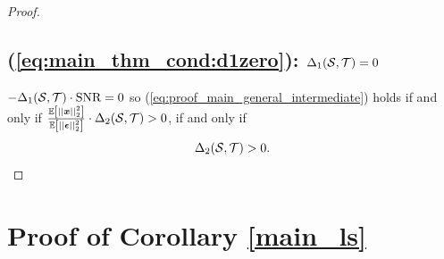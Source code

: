 {\begin{proof}
\subsection*{\texorpdfstring{(\ref{eq:main_thm_cond:d1zero}): $\Delta_{1}(\mathcal{S},\mathcal{T}) = 0$}{(\ref{eq:main_thm_cond:d1zero}): \textDelta\textoneinferior(S,T) = 0}}
$-\Delta_{1}(\mathcal{S},\mathcal{T}) \cdot \textrm{SNR} = 0$ so (\ref{eq:proof_main_general_intermediate}) holds if and only if $ {\color{black} \frac{\expect{\sqnormvec{\vect{x}}}}{\expect{\sqnormvec{\vect{\epsilon}}}} }\cdot \Delta_{2}(\set{S},\set{T}) > 0$, if and only if
\begin{equation}
\Delta_{2}(\mathcal{S},\mathcal{T}) > 0.
\end{equation}
\end{proof}
}


\section{Proof of Corollary \ref{main_ls}}
\label{proof_appendix_LS}
